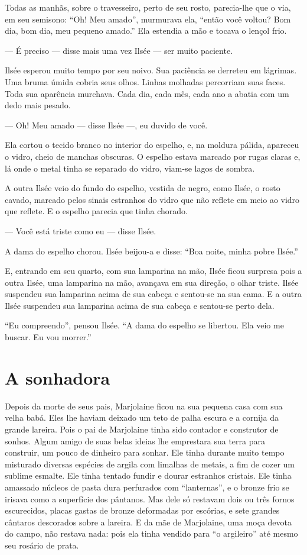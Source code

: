 Todas as manhãs, sobre o travesseiro, perto de seu rosto, parecia-lhe
que o via, em seu semisono: “Oh! Meu amado'', murmurava ela, ``então você
voltou? Bom dia, bom dia, meu pequeno amado.” Ela estendia a mão e tocava
o lençol frio.

--- É preciso --- disse mais uma vez Ilsée --- ser muito paciente.

Ilsée esperou muito tempo por seu noivo. Sua paciência se derreteu em
lágrimas. Uma bruma úmida cobria seus olhos. Linhas molhadas percorriam
suas faces. Toda sua aparência murchava. Cada dia, cada mês, cada ano a
abatia com um dedo mais pesado.

--- Oh! Meu amado --- disse Ilsée ---, eu duvido de você.

Ela cortou o tecido branco no interior do espelho, e, na moldura
pálida, apareceu o vidro, cheio de manchas obscuras. O espelho estava
marcado por rugas claras e, lá onde o metal tinha se separado do vidro,
viam-se lagos de sombra.

A outra Ilsée veio do fundo do espelho, vestida de negro, como Ilsée, o
rosto cavado, marcado pelos sinais estranhos do vidro que não reflete em meio
ao vidro que reflete. E o espelho parecia que tinha chorado.

--- Você está triste como eu --- disse Ilsée.

A dama do espelho chorou. Ilsée beijou-a e disse: “Boa noite, minha pobre
Ilsée.”

E, entrando em seu quarto, com sua lamparina na mão, Ilsée ficou
surpresa pois a outra Ilsée, uma lamparina na mão, avançava em sua
direção, o olhar triste. Ilsée suspendeu sua lamparina acima de sua cabeça
e sentou-se na sua cama. E a outra Ilsée suspendeu sua lamparina acima de
sua cabeça e sentou-se perto dela.

“Eu compreendo”, pensou Ilsée. “A dama do espelho se libertou. Ela veio
me buscar. Eu vou morrer.”

\section{A sonhadora}

Depois da morte de seus pais, Marjolaine ficou na sua pequena casa com
sua velha babá. Eles lhe haviam deixado um teto de palha escura e a
cornija da grande lareira. Pois o pai de Marjolaine tinha sido contador
e construtor de sonhos. Algum amigo de suas belas ideias lhe emprestara
sua terra para construir, um pouco de dinheiro para sonhar. Ele tinha
durante muito tempo misturado diversas espécies de argila com limalhas de
metais, a fim de cozer um sublime esmalte. Ele tinha tentado fundir e
dourar estranhos cristais. Ele tinha amassado núcleos de pasta dura
perfurados com “lanternas”, e o bronze frio se irisava como a superfície
dos pântanos. Mas dele só restavam dois ou três fornos escurecidos, placas
gastas de bronze deformadas por escórias, e sete grandes cântaros
descorados sobre a lareira. E da mãe de Marjolaine, uma moça devota do
campo, não restava nada: pois ela tinha vendido para “o argileiro” até
mesmo seu rosário de prata.


